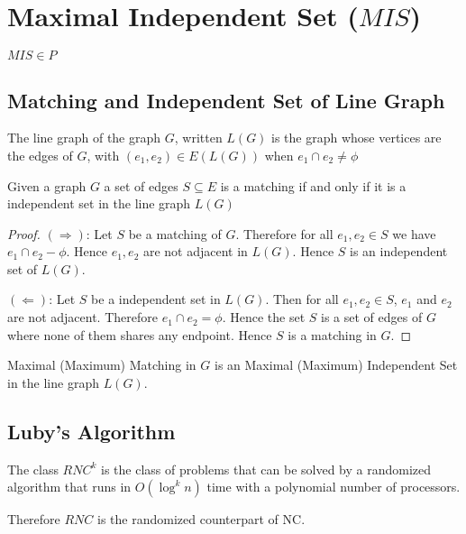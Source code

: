 \section{Maximal Independent Set ($MIS$)}
\begin{theorem}
	$MIS\in P$
\end{theorem}

\subsection{Matching and Independent Set of Line Graph}

\begin{definition}
	The line graph of the graph $G$, written $L(G)$  is the graph whose vertices are the edges of $G$, with $(e_1,e_2)\in E(L(G))$ when $e_1\cap e_2\neq \phi$
\end{definition}

\begin{theorem}
	Given a graph $G$ a set of edges $S\subseteq E$ is a matching if and only if it is a independent set in the line graph $L(G)$
\end{theorem}
\begin{proof}
	$(\Rightarrow)$: Let $S$ be a matching of $G$. Therefore for all $e_1,e_2\in S$ we have $e_1\cap e_2-\phi$. Hence $e_1,e_2$ are not adjacent in $L(G)$. Hence $S$ is an independent set of $L(G)$.
	
	$(\Leftarrow)$: Let $S$ be a independent set in $L(G)$. Then for all $e_1,e_2\in S$, $e_1$ and $e_2$ are not adjacent. Therefore $e_1\cap e_2=\phi$. Hence the set $S$ is a set of edges of $G$ where none of them shares any endpoint. Hence $S$ is a matching in $G$.
\end{proof}

\begin{fact}
	Maximal (Maximum) Matching in $G$ is an Maximal (Maximum) Independent Set  in the line graph $L(G)$.
\end{fact}

\subsection{Luby's Algorithm}
\begin{definition}[$RNC^{k}$]
	The class $RNC^{k}$ is the class of problems that can be solved by a randomized algorithm that runs in $O(\log^k n)$ time with a polynomial number of processors. 
\end{definition}
\begin{remark}
	Therefore $RNC$ is the randomized counterpart of NC.\parinn
\end{remark}

